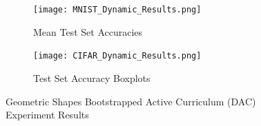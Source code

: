\begin{figure}[h!]
\hspace*{-3cm}    
\centering
\begin{subfigure}{0.7\textwidth}
  \centering
  \texttt{[image: MNIST\_Dynamic\_Results.png]}
  \caption{ Mean Test Set Accuracies}
  \label{fig:DAC_ste_MNIST}
\end{subfigure}%
\begin{subfigure}{0.7\textwidth}
\hspace*{-1cm}   
  \centering
  \texttt{[image: CIFAR\_Dynamic\_Results.png]}
  \caption{Test Set Accuracy Boxplots}
  \label{fig:DAC_ste_CIFAR}
\end{subfigure}
\caption{Geometric Shapes Bootstrapped Active Curriculum (DAC) Experiment Results}
\label{fig:DACResults}
\end{figure}